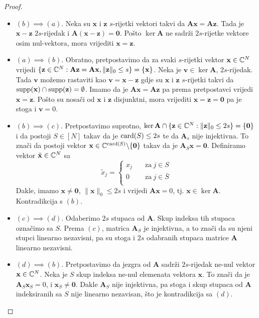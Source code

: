 \documentclass[a4paper,twoside,12pt]{memoir} %
\newcommand{\vect}[1]{\mathbf{#1}}
\renewcommand{\vec}{\vect}
\newcommand{\card}{\text{\normalfont{card}}}
\newcommand{\supp}{\text{\normalfont{supp}}}
\newcommand{\norm}[1]{\|{#1}\|}
\begin{document}
\begin{proof}
    \begin{itemize}
        \item[]$(b)\implies(a)$. Neka su $\vec x$ i $\vec z$ $s$-rijetki vektori takvi da $\vec{Ax} = \vec{Az}$. Tada je $\vec x - \vec z$ $2s$-rijedak i $\vec A(\vec x - \vec z) = \vec 0$. Po\v{s}to $\ker \vec A$ ne sadr\v{z}i $2s$-rijetke vektore osim nul-vektora, mora vrijediti $\vec x = \vec z$.
        \item[] $(a)\implies(b)$. Obratno, pretpostavimo da za svaki $s$-rijetki vektor $\vec x \in \C^N$ vrijedi $\{\vec z \in \C^N : \vec{Az} = \vec{Ax}, \norm{\vec z}_0 \leq s\} = \{\vec x\}$. Neka je $\vec v \in \ker \vec A$, $2s$-rijedak. Tada $\vec v$ mo\v{z}emo rastaviti kao $\vec v = \vec x - \vec z$ gdje su $\vec x$ i $\vec z$ $s$-rijetki takvi da $\supp(\vec x)\cap \supp(\vec z) = \emptyset$. Imamo da je $\vec{Ax}=\vec{Az}$ pa prema pretpostavci vrijedi $\vec{x}=\vec{z}$. Po\v{s}to su nosa\v{c}i od $\vec x$ i $\vec z$ disjunktni, mora vrijediti $\vec x = \vec z = \vec 0$ pa je stoga i $\vec v = 0$.
        \item[] $(b)\implies(c)$. Pretpostavimo suprotno, $\ker \vec A \cap \{\vec z \in \C^N: \norm{\vec z}_0 \leq 2s\} = \{\vec 0\}$ i da postoji $S \in [N]$ takav da je $\card(S) \leq 2s$ te da $\vec A_s$ nije injektivna. To zna\v{c}i da postoji vektor $\vec x \in \C^{\card(S)} \backslash \{\vec 0\}$ takav da je $\vec A_S \vec x = \vec 0$. Definiramo vektor $\tilde{\vec{x}}\in \C^N$ sa 
            \begin{equation*}
                \tilde{x}_j = 
                \begin{cases}
                    x_j \quad & \text{za}\ j \in S \\
                    0 \quad & \text{za}\  j \in \bar S \\
                \end{cases}
            \end{equation*}
            Dakle, imamo $\vec x \neq \vec 0$, $\norm{\vec x}_0 \leq 2s$ i vrijedi $\vec{Ax}=0$, tj. $\vec x \in \ker \vec A$. Kontradikcija s $(b)$.
        \item[]$(c)\implies(d)$. Odaberimo $2s$  stupaca od $\vec A$. Skup indeksa tih stupaca ozna\v{c}imo sa $S$. Prema $(c)$, matrica $\vec A_S$ je injektivna, a to zna\v{c}i da su njeni stupci linearno nezavisni, pa su stoga i $2s$ odabranih stupaca matrice $\vec A$ linearno nezavisni.
        \item[]$(d)\implies(b)$. Pretpostavimo da jezgra od $\vec A$ sadr\v{z}i $2s$-rijedak ne-nul vektor $\vec x \in \C^N$. Neka je $S$ skup indeksa ne-nul elemenata vektora $\vec x$. To zna\v{c}i da je $\vec A_S \vec x_S = 0$, i $\vec x_S \neq \vec 0$. Dakle $\vec A_S$ nije injektivna, pa stoga i skup stupaca od $\vec A$ indeksiranih sa $S$ nije linearno nezavisan, \v{s}to je kontradikcija sa $(d)$.
\end{itemize}
\end{proof}
\end{document}
